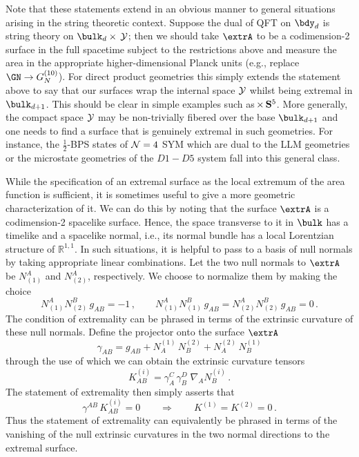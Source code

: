 \documentclass[12pt,openany]{book}
\begin{document}
Note that these statements extend in an obvious manner to general situations arising in the string theoretic context. Suppose the dual of QFT on $\bdy_d$ is string theory on $\bulk_d\times\, {\cal Y}$; then we should take $\extrA$ to be a codimension-2 surface in the full spacetime subject to the restrictions above and measure the area in the appropriate higher-dimensional Planck units (e.g., replace $\GN \to G_N^{(10)}$). For direct product geometries this simply extends the statement above to say that our surfaces wrap the internal space ${\cal Y}$ whilst being extremal in $\bulk_{d+1}$. This should be clear in simple examples such as  $\! \times \, {\bf S}^5$. More generally, the compact space ${\cal Y}$ may be non-trivially fibered over the base $\bulk_{d+1}$
and one needs to find a surface that is genuinely extremal in such geometries. For instance, the $\frac{1}{2}$-BPS states of ${\cal N}=4$ SYM which are dual to the LLM geometries \cite{Lin:2004nb} or the microstate geometries of the $D1-D5$ system \cite{Lunin:2002bj} fall into this general class.


While the specification of an extremal surface as the local extremum of the area function is sufficient, it is sometimes useful to give a more geometric characterization of it. We can do this by noting that the surface $\extrA$ is a codimension-2 spacelike surface. Hence, the space transverse to it in $\bulk$ has a timelike and a spacelike normal, i.e., its normal bundle has a local Lorentzian structure of ${\mathbb R}^{1,1}$. In such situations, it is helpful to pass to a basis of null normals by taking appropriate linear combinations. Let the two null normals to $\extrA$ be $N_{(1)}^A$ and $N_{(2)}^A$, respectively. We choose to normalize them by making the choice
%
\begin{equation}
N_{(1)}^A N_{(2)}^B \, g_{AB} = -1 \,, \qquad N_{(1)}^A N_{(1)}^B\, g_{AB} = N_{(2)}^A N_{(2)}^B\, g_{AB}  = 0\,.
\label{eq:ndef}
\end{equation}
%
The condition of extremality can be phrased in terms of the extrinsic curvature of these null normals. Define
the projector onto the surface $\extrA$
%
\begin{equation}
\gamma_{AB} = g_{AB}  + N^{(1)}_A \, N^{(2)}_B  + N^{(2)}_A \, N^{(1)}_B
\label{eq:gamdef}
\end{equation}
%
through the use of which we can obtain the extrinsic curvature tensors
%
\begin{equation}
K^{(i)}_{AB} = \gamma^C_A \, \gamma^D_B\;  \nabla_A N^{(i)}_B \,.
\label{eq:ecurvdef}
\end{equation}
%
The statement of extremality then simply asserts that
%
\begin{equation}
\gamma^{AB}\, K^{(i)}_{AB} = 0  \qquad \Longrightarrow \qquad K^{(1)} = K^{(2)} =0\,.
\label{eq:extrK0}
\end{equation}
%
Thus the statement of extremality can equivalently be phrased in terms of the vanishing of the null extrinsic curvatures in the two normal directions to the extremal surface.
\end{document}
